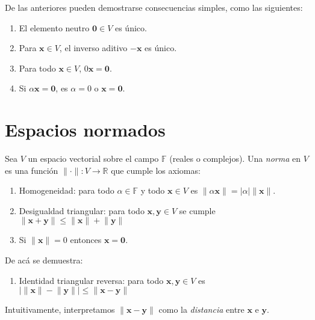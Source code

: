   De las anteriores pueden demostrarse consecuencias simples,
  como las siguientes:
  \begin{enumerate}
  \item
    El elemento neutro \(\mathbf{0} \in V\) es único.
  \item
    Para \(\mathbf{x} \in V\),
    el inverso aditivo \(-\mathbf{x}\) es único.
  \item
    Para todo \(\mathbf{x} \in V\),
    \(0 \mathbf{x} = \mathbf{0}\).
  \item
    Si \(\alpha \mathbf{x} = \mathbf{0}\),
    es \(\alpha = 0\) o \(\mathbf{x} = \mathbf{0}\).
  \end{enumerate}

\section{Espacios normados}
\label{sec:espacios-normados}

  \begin{definition}
    \label{def:norma}
    Sea \(V\) un espacio vectorial sobre el campo \(\mathbb{F}\)
    (reales o complejos).
    Una \emph{norma} en \(V\) es una función
    \(\lVert \cdot \rVert \colon V \to \mathbb{R}\) que cumple los axiomas:
    \begin{enumerate}
    \item
      Homogeneidad:
      para todo \(\alpha \in \mathbb{F}\) y todo \(\mathbf{x} \in V\)
      es \(\lVert \alpha \mathbf{x} \rVert
             = \lvert \alpha \rvert \lVert \mathbf{x} \rVert\).
    \item
      Desigualdad triangular:
      para todo \(\mathbf{x}, \mathbf{y} \in V\)
      se cumple
      \(\lVert \mathbf{x} + \mathbf{y} \rVert
          \le \lVert \mathbf{x} \rVert + \lVert \mathbf{y} \rVert\)
    \item
      Si \(\lVert \mathbf{x} \rVert = 0\) entonces \(\mathbf{x} = \mathbf{0}\).
    \end{enumerate}
  \end{definition}
  De acá se demuestra:
  \begin{enumerate}
  \item
    Identidad triangular reversa:
    para todo \(\mathbf{x}, \mathbf{y} \in V\) es
    \(\lvert \lVert \mathbf{x} \rVert - \lVert \mathbf{y} \rVert \rvert
        \le \lVert \mathbf{x} - \mathbf{y} \rVert\)
  \end{enumerate}
  Intuitivamente,
  interpretamos \(\lVert \mathbf{x} - \mathbf{y} \rVert\)
  como la \emph{distancia} entre \(\mathbf{x}\) e \(\mathbf{y}\).

